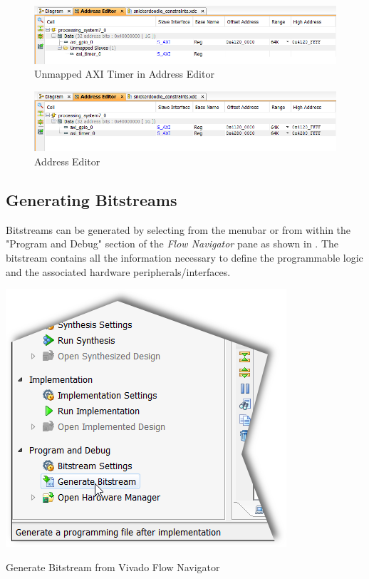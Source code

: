 \begin{figure}
	\centering
	\includegraphics{images/vivado/Address_Editor_Set.png}
	\caption{Unmapped AXI Timer in Address Editor}
	\label{fig:addreditorset}
\end{figure}



\begin{figure}
	\centering
	\includegraphics{images/vivado/Address_Editor.png}
	\caption{Address Editor}
	\label{fig:addreditor}
\end{figure}




\subsection{Generating Bitstreams}

Bitstreams can be generated by selecting  from the menubar or from within the "Program and Debug" section of the \textit{Flow Navigator} pane as shown in . The bitstream contains all the information necessary to define the programmable logic and the associated hardware peripherals/interfaces.

\begin{marginfigure}
	\centering
	\includegraphics{images/vivado/generate_bitstream.png}
	\caption[Generate Bitstream from Vivado Flow Navigator]{Generate Bitstream from Vivado Flow Navigator}
	\label{fig:genbitstream}
\end{marginfigure}


